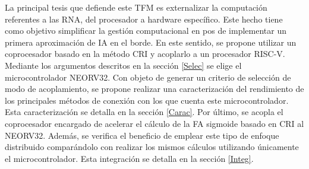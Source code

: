 
La principal tesis que defiende este TFM es externalizar la computación referentes a las RNA, del procesador a hardware específico.
Este hecho tiene como objetivo simplificar la gestión computacional en pos de implementar un primera aproximación de IA en el borde.
En este sentido, se propone utilizar un coprocesador basado en la método CRI y acoplarlo a un procesador RISC-V.
Mediante los argumentos descritos en la sección \ref{Selec} se elige el microcontrolador NEORV32. 
Con objeto de generar un criterio de selección de modo de acoplamiento, se propone realizar una caracterización del rendimiento de los principales métodos de conexión con los que cuenta este microcontrolador.
Esta caracterización se detalla en la sección \ref{Carac}.
Por último, se acopla el coprocesador encargado de acelerar el cálculo de la FA sigmoide basado en CRI al NEORV32. 
Además, se verifica el beneficio de emplear este tipo de enfoque distribuido comparándolo con realizar los mismos cálculos utilizando únicamente el microcontrolador.
Esta integración se detalla en la sección \ref{Integ}.

